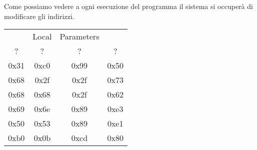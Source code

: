 Come possiamo vedere a ogni esecuzione del programma il sistema si occuperà di modificare gli indirizzi.
\begin{center}
    \begin{table}[h!]
        \centering
        \begin{tabular}{c c c c}
             & Local & Parameters & \\
            ? & ? & ? & ? \\
            0x31 & 0xc0 & 0x99 & 0x50 \\
            0x68 & 0x2f & 0x2f & 0x73 \\
            0x68 & 0x68 & 0x2f & 0x62 \\
            0x69 & 0x6e & 0x89 & 0xe3 \\
            0x50 & 0x53 & 0x89 & 0xe1 \\
            0xb0 & 0x0b & 0xcd & 0x80 \\
        \end{tabular}
    \end{table}
\end{center}
